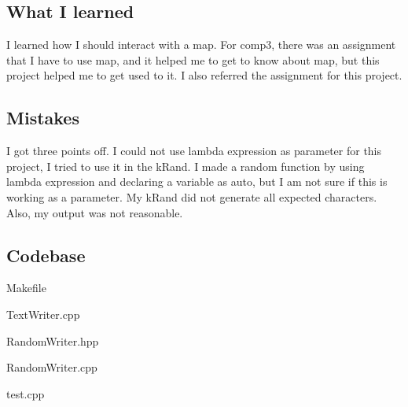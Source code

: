 
\subsection{What I learned}\label{sec:ps6:learned}

I learned how I should interact with a map. For comp3, there was an assignment that I have to use map, and it helped me to get to know about map, but this project helped me to get used to it. I also referred the assignment for this project.

\subsection{Mistakes}\label{sec:ps6:Mistakes}
I got three points off.
I could not use lambda expression as parameter for this project, I tried to use it in the kRand. I made a random function by using lambda expression and declaring a variable as auto, but I am not sure if this is working as a parameter.
My kRand did not generate all expected characters.
Also, my output was not reasonable.

\subsection{Codebase}\label{sec:ps6:code}
Makefile

TextWriter.cpp

RandomWriter.hpp

RandomWriter.cpp

test.cpp


\newpage

